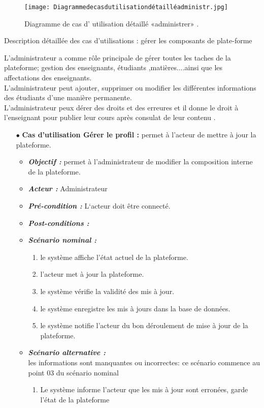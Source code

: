 \begin{figure}[ht]
	\centering
	\texttt{[image: Diagrammedecasdutilisationdétailléadministr.jpg]}
	\caption{Diagramme de cas d' utilisation  détaillé «administrer» .}
	\label{fig:Diagramme de cas d' utilisation  détaillé administrer  }
\end{figure}
\FloatBarrier
\clearpage
{\Large \color{cyan} Description détaillée des cas d’utilisations : gérer les composants de plate-forme}

L'administrateur a comme rôle principale de gérer toutes les taches de la plateforme; gestion des enseignants, étudiants ,matières....ainsi que les affectations des
enseignants.\\
L'administrateur peut ajouter, supprimer ou modifier les différentes informations des étudiants d'une manière permanente.\\
L'administrateur peux dérer des droits et des erreures et il donne le droit à l'enseignant pour publier leur cours après  consulat  de leur contenu .
\begin{itemize}
      \item[$\bullet$] \textbf{Cas d’utilisation Gérer le profil :} permet à l’acteur de mettre à jour la plateforme. 
	\medskip
	\begin{itemize}
		\item \textit{\textbf{Objectif :}}  permet à l’administrateur de modifier la composition interne de la plateforme. 
		
		\item \textit{\textbf{Acteur :}} Administrateur
		
		\item \textit{\textbf{Pré-condition  :}}  L‘acteur doit être connecté.
		\item \textit{\textbf{Post-conditions   :}}
		\item \textit{\textbf{Scénario nominal :}}
		\begin{enumerate}
			\item le système affiche l’état actuel de la plateforme. 
			\item l’acteur met à jour la plateforme. 
			\item   le système vérifie la validité des mis à jour.  
			\item  le système enregistre les mis à jours dans la base de données.  
			\item le système notifie l’acteur du bon déroulement de mise à jour de la plateforme.
		\end{enumerate}
		\item \textit{\textbf{Scénario alternative :}} \\
les informations sont manquantes ou incorrectes: ce scénario commence au point 03 du
scénario nominal
		\begin{enumerate}
			\item  Le système informe l’acteur que les mis à jour sont erronées, garde l’état de la plateforme 
		\end{enumerate}
	\end{itemize}
\end{itemize}
\clearpage	

